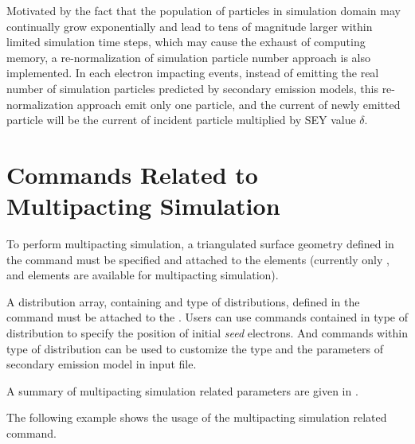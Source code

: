 Motivated by the fact that the population of particles in simulation domain may continually grow exponentially and lead to tens of magnitude larger within limited simulation time steps, which may cause the exhaust of computing memory, a re-normalization of simulation particle number approach is also implemented. In each electron impacting events, instead of emitting the real number of simulation particles predicted by secondary emission models, this re-normalization approach emit only one particle, and the current of newly emitted particle will be the current of incident particle multiplied by SEY value $\delta$.
\clearpage
\section{Commands Related to Multipacting Simulation}
\label{sec:MultipactingCmd}
To perform multipacting simulation, a triangulated surface geometry defined in the   command  must be specified and attached to the elements (currently only ,  and  elements are available for multipacting simulation).

A distribution array, containing  and  type of distributions, defined in the  command must be attached to the
. Users can use commands contained in  type of distribution to specify the position of initial \emph{seed} electrons. And commands within  type of distribution can be used to customize the type and the parameters of secondary emission model in input file.

A summary of multipacting simulation related parameters are given in .

The following example shows the usage of the multipacting simulation related command.\\

